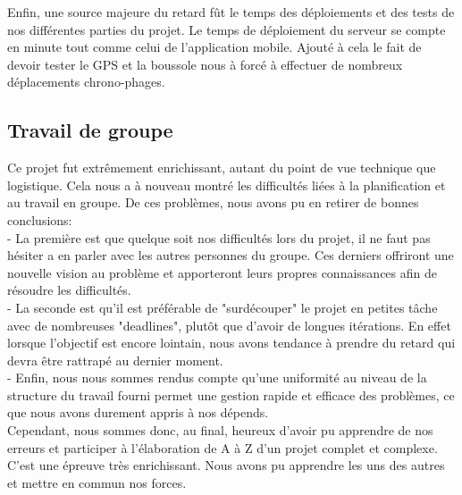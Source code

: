 \documentclass[french]{article}
\begin{document}
		Enfin, une source majeure du retard fût le temps des déploiements et des tests de nos différentes parties du projet. Le temps de déploiement du serveur se compte en minute tout comme celui de l'application mobile.
		Ajouté à cela le fait de devoir tester le GPS et la boussole nous à forcé à effectuer de nombreux déplacements chrono-phages.

		
		\subsection{Travail de groupe}
		Ce projet fut extrêmement enrichissant, autant du point de vue technique que logistique. Cela nous a à nouveau montré les difficultés liées à la planification et au travail en groupe. De ces problèmes, nous avons pu en retirer de bonnes conclusions: \\
		
		- La première est que quelque soit nos difficultés lors du projet, il ne faut pas hésiter a en parler avec les autres personnes du groupe. Ces derniers offriront une nouvelle vision au problème et apporteront leurs propres connaissances afin de résoudre les difficultés. \\
		
		- La seconde est qu'il est préférable de "surdécouper" le projet en petites tâche avec de nombreuses "deadlines", plutôt que d'avoir de longues itérations. En effet lorsque l'objectif est encore lointain,  nous avons tendance à prendre du retard qui devra être rattrapé au dernier moment. \\
		
		- Enfin, nous nous sommes rendus compte qu'une uniformité au niveau de la structure du travail fourni permet une gestion rapide et efficace des problèmes, ce que nous avons durement appris à nos dépends. \\ 
		
		
		Cependant, nous sommes donc, au final, heureux d'avoir pu apprendre de nos erreurs et participer à l'élaboration de A à Z d'un projet complet et complexe. C'est une épreuve très enrichissant. Nous avons pu apprendre les uns des autres et mettre en commun nos forces. 
		
		\newpage
	
	\newpage
	

			
	
	\listoffigures
			
\end{document}
